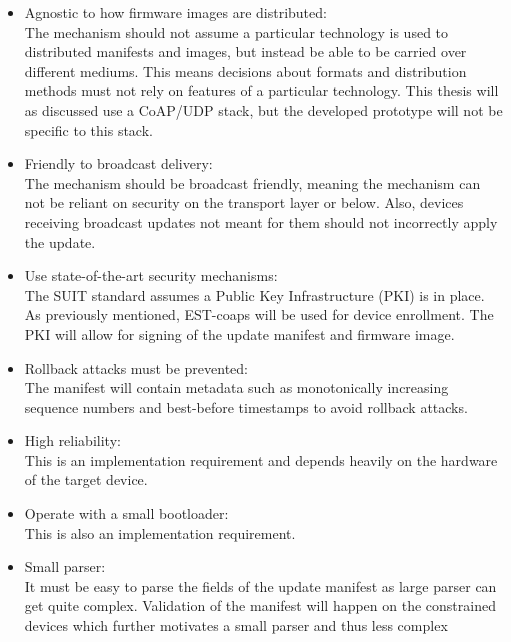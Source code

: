 \documentclass[0-thesis.tex]{subfiles}
\begin{document}
\begin{itemize}
    \item Agnostic to how firmware images are distributed:\\
            The mechanism should not assume a particular technology is used to distributed
            manifests and images, but instead be able to be carried over different
            mediums. This means decisions about formats and distribution methods must not
            rely on features of a particular technology. This thesis will as discussed use
            a CoAP/UDP stack, but the developed prototype will not be specific to this
            stack.
    \item Friendly to broadcast delivery:\\
            The mechanism should be broadcast friendly, meaning the mechanism can not be
            reliant on security on the transport layer or below. Also, devices receiving
            broadcast updates not meant for them should not incorrectly apply the update.
    \item Use state-of-the-art security mechanisms:\\
            The SUIT standard assumes a Public Key Infrastructure (PKI) is in place. As
            previously mentioned, EST-coaps will be used for device enrollment. The PKI
            will allow for signing of the update manifest and firmware image.
    \item Rollback attacks must be prevented:\\
            The manifest will contain metadata such as monotonically increasing sequence
            numbers and best-before timestamps to avoid rollback attacks.
    \item High reliability:\\
            This is an implementation requirement and depends heavily on the hardware of
            the target device. %
    \item Operate with a small bootloader:\\
            This is also an implementation requirement. %
    \item Small parser:\\
            It must be easy to parse the fields of the update manifest as large parser can
            get quite complex. Validation of the manifest will happen on the constrained
            devices which further motivates a small parser and thus less complex

\end{itemize}
\end{document}
